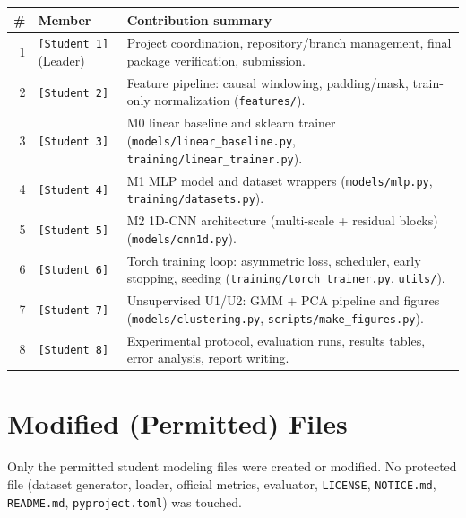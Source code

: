 \documentclass[11pt,a4paper]{article}
\newcommand{\code}[1]{\texttt{\small #1}}
\begin{document}
\begin{longtable}{r p{4.0cm} p{8.5cm}}
\toprule
\# & Member & Contribution summary\\
\midrule
\endhead
1 & \texttt{[Student 1]} (Leader) & Project coordination, repository/branch management, final package verification, submission.\\
2 & \texttt{[Student 2]} & Feature pipeline: causal windowing, padding/mask, train-only normalization (\code{features/}).\\
3 & \texttt{[Student 3]} & M0 linear baseline and sklearn trainer (\code{models/linear\_baseline.py}, \code{training/linear\_trainer.py}).\\
4 & \texttt{[Student 4]} & M1 MLP model and dataset wrappers (\code{models/mlp.py}, \code{training/datasets.py}).\\
5 & \texttt{[Student 5]} & M2 1D-CNN architecture (multi-scale + residual blocks) (\code{models/cnn1d.py}).\\
6 & \texttt{[Student 6]} & Torch training loop: asymmetric loss, scheduler, early stopping, seeding (\code{training/torch\_trainer.py}, \code{utils/}).\\
7 & \texttt{[Student 7]} & Unsupervised U1/U2: GMM + PCA pipeline and figures (\code{models/clustering.py}, \code{scripts/make\_figures.py}).\\
8 & \texttt{[Student 8]} & Experimental protocol, evaluation runs, results tables, error analysis, report writing.\\
\bottomrule
\end{longtable}

\section{Modified (Permitted) Files}

Only the permitted student modeling files were created or modified. No protected
file (dataset generator, loader, official metrics, evaluator, \code{LICENSE},
\code{NOTICE.md}, \code{README.md}, \code{pyproject.toml}) was touched.
\end{document}
